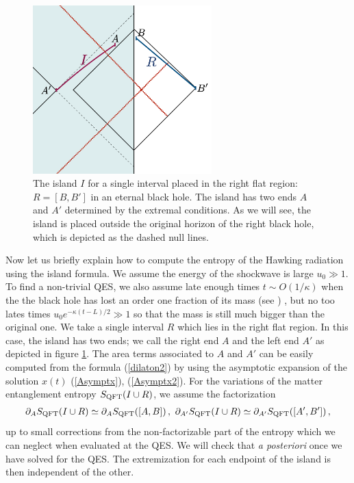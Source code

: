 \documentclass[12pt]{article}
\def\ba{\begin{eqnarray}}
\def\ea{\end{eqnarray}}
\numberwithin{equation}{section}
\def\pp{\partial}
\def\ba{\begin{eqnarray}}
\def\ea{\end{eqnarray}}
\begin{document}
\begin{spacing}{1.1}
\begin{figure}
     \begin{center}
 \includegraphics[height=6.5cm]{figures/Island_evap2.png}
  \caption{The island $I$ for a single interval placed in the right flat region: $R=[B,B']$ in an eternal black hole. The island has two ends $A$ and $A'$ determined by the extremal conditions. As we will see, the island is placed outside the original horizon of the right black hole, which is depicted as the dashed null lines.}
  \label{conf_island}
 \end{center}
 \end{figure}
  Now let us briefly explain how to compute the entropy of the Hawking radiation using the island formula. We assume the energy of the shockwave is large $u_0\gg 1$.  To find a non-trivial QES, we also assume late enough times $t \sim O(1/\kappa)$ when the the black hole has lost an order one fraction of its mass (see \cite{Almheiri:2019psf}) , but no too lates times  $u_0 e^{-\kappa(t-L)/2} \gg 1$ so that the mass is still much bigger than the original one. We take a single interval $R$ which lies in the right flat region. In this case, the island has two ends; we call the right end $A$ and the left end $A'$ as depicted in figure \ref{conf_island}.    The area terms associated to $A$ and $A'$ can be easily computed from the formula (\ref{dilaton2}) by using the asymptotic expansion of the solution $x(t)$ (\ref{Asymptx}), (\ref{Asymptx2}). For the variations of the matter entanglement entropy $S_{\rm QFT}(I\cup R)$, we assume the factorization 
     \ba\label{factorization}
\pp_{A} S_{\rm QFT}(I\cup R)\simeq \pp_{A}  S_{\rm QFT}([A,B])\, ,\
\pp_{A'} S_{\rm QFT}(I\cup R)\simeq \pp_{A'}  S_{\rm QFT}([A',B'])\, ,
\ea
up to small corrections from the non-factorizable part of the entropy which we can neglect when evaluated at the QES. We will check that \textit{a posteriori} once we have solved for the QES. The extremization for each endpoint of the island is then independent of the other.

\end{spacing}
\end{document}
